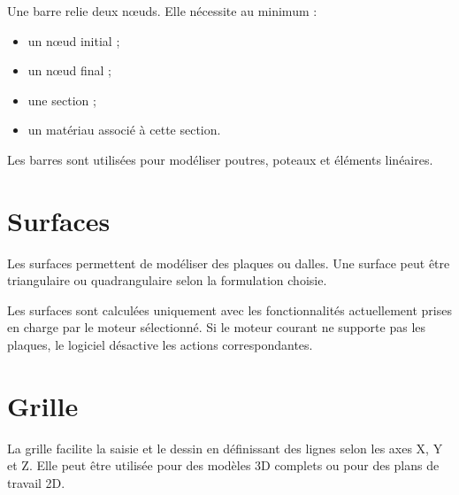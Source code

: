 Une barre relie deux nœuds. Elle nécessite au minimum :

\begin{itemize}
  \item un nœud initial ;
  \item un nœud final ;
  \item une section ;
  \item un matériau associé à cette section.
\end{itemize}

Les barres sont utilisées pour modéliser poutres, poteaux et éléments linéaires.

\section{Surfaces}

Les surfaces permettent de modéliser des plaques ou dalles. Une surface peut
être triangulaire ou quadrangulaire selon la formulation choisie.

\begin{warningbox}
Les surfaces sont calculées uniquement avec les fonctionnalités actuellement
prises en charge par le moteur sélectionné. Si le moteur courant ne supporte pas
les plaques, le logiciel désactive les actions correspondantes.
\end{warningbox}

\section{Grille}

La grille facilite la saisie et le dessin en définissant des lignes selon les
axes X, Y et Z. Elle peut être utilisée pour des modèles 3D complets ou pour des
plans de travail 2D.

